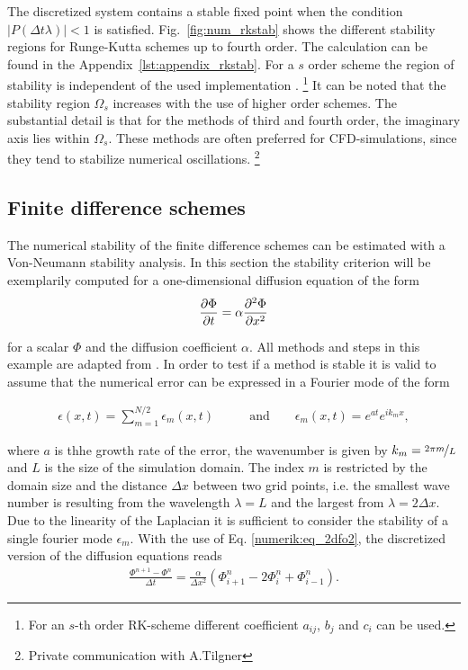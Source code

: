 The discretized system contains a stable fixed point when the condition $|P(\Delta t \lambda)| < 1$ is satisfied.
Fig.~\ref{fig:num_rkstab} shows the different stability regions for Runge-Kutta schemes up to fourth order.
The calculation can be found in the Appendix~\ref{lst:appendix_rkstab}.
For a $s$ order scheme the region of stability is independent of the used implementation \citep{canuto2007}.
\footnote{For an $s$-th order RK-scheme different coefficient $a_{ij}$, $b_j$ and $c_i$ can be used.}
It can be noted that the stability region $\Omega_s$ increases with the use of higher order schemes.
The substantial detail is that for the  methods of third and fourth order, the imaginary axis lies within $\Omega_s$.
These methods are often preferred for  CFD-simulations, since they tend to stabilize numerical oscillations. \footnote{Private communication with A.Tilgner}

\subsection{Finite difference schemes}

The numerical stability of the finite difference schemes can be estimated with a Von-Neumann stability analysis.
In this section the stability criterion will be exemplarily computed for a one-dimensional diffusion equation of the form
\begin{align}
    \label{num:vne_diffusion_theo}
    \pdn[\Phi]{t} = \alpha  \pdn[^2\Phi]{x^2}
\end{align}

for a scalar $\Phi$ and  the diffusion coefficient $\alpha$.
All methods and steps in this example are adapted from \citep{janderson}.
In order to test if a method is stable it is valid to assume that the numerical error can be expressed in a Fourier mode of the form

\begin{align}
    \epsilon(x, t) = \sum_{m=1}^{N/2} \epsilon_m(x, t) \qquad &\text{and} \qquad  \epsilon_m(x, t) = e^{at}e^{i k_m x},
\end{align}

where $a$  is thhe growth rate of the error, the wavenumber is given by $k_m=\nicefrac{2\pi m}{L}$ and $L$ is the size of the simulation domain.
The index $m$ is restricted by the domain size and the distance $\Delta x$ between two grid points, i.e. the smallest wave number
is resulting from the wavelength $\lambda=L$ and the largest from $\lambda=2\Delta x$.
Due to the linearity of the Laplacian it is sufficient to consider the stability of a single fourier mode $\epsilon_m$.
With the use of Eq.  \ref{numerik:eq_2dfo2}, the discretized version of the diffusion equations reads
\begin{align}
    \label{num:neumann_diffusion_eq}
    \frac{\Phi^{n+1} - \Phi^n}{\Delta t} = \frac{\alpha}{\Delta x^2}\left(\Phi_{i+1}^n - 2\Phi_{i}^n + \Phi_{i-1}^n\right).
\end{align}

